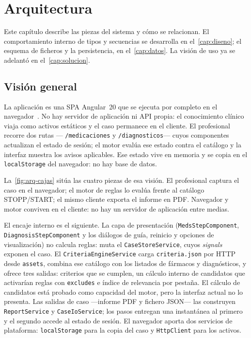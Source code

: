 
\chapter{Arquitectura}
\label{cap:arquitectura}

Este capítulo describe las piezas del sistema y cómo se relacionan. El
comportamiento interno de tipos y secuencias se desarrolla en
el~\cref{cap:diseno}; el esquema de ficheros y la persistencia, en
el~\cref{cap:datos}. La visión de uso ya se adelantó en
el~\cref{cap:solucion}.

\section{Visión general}

La aplicación es una SPA Angular~20 que se ejecuta por completo en el
navegador~\cite{angular2026}. No hay servidor de aplicación ni API
propia: el conocimiento clínico viaja como activos estáticos y el caso
permanece en el cliente. El profesional recorre dos rutas ---
\texttt{/medicaciones} y \texttt{/diagnosticos}--- cuyos componentes
actualizan el estado de sesión; el motor evalúa ese estado contra el
catálogo y la interfaz muestra los avisos aplicables. Ese estado vive en
memoria y se copia en el \texttt{localStorage} del navegador: no hay
base de datos.

La~\cref{fig:arq-cajas} sitúa las cuatro piezas de esa visión. El
profesional captura el caso en el navegador; el motor de reglas lo
evalúa frente al catálogo STOPP/START; el mismo cliente exporta el
informe en PDF. Navegador y motor conviven en el cliente: no hay un
servidor de aplicación entre medias.



El encaje interno es el siguiente. La capa de presentación
(\texttt{MedsStepComponent}, \texttt{DiagnosisStepComponent} y los
diálogos de guía, reinicio y opciones de visualización) no calcula
reglas: muta el \texttt{CaseStoreService}, cuyos \textit{signals}
exponen el caso. El \texttt{CriteriaEngineService} carga
\texttt{criteria.json} por HTTP desde \texttt{assets}, combina ese
catálogo con los listados de fármacos y diagnósticos, y ofrece tres
salidas: criterios que se cumplen, un cálculo interno de candidatos que
activarían reglas con \texttt{excludes} e índice de relevancia por pestaña.
El cálculo de candidatos está probado como capacidad del motor, pero la
interfaz actual no lo presenta. Las salidas de caso ---informe PDF y
fichero JSON--- las construyen \texttt{ReportService} y
\texttt{CaseIoService}; los pasos entregan una instantánea al primero y el
segundo accede al estado de sesión. El
navegador aporta dos servicios de plataforma: \texttt{localStorage}
para la copia del caso y \texttt{HttpClient} para los activos.

